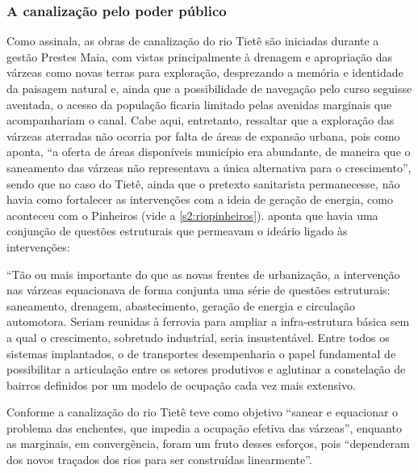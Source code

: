 \documentclass[
article,			%
11pt,				%
oneside,			%
a4paper,			%
english,			%
brazil,				%
sumario=tradicional
]{abntex2}
\begin{document}
%	
	
	\subsubsection{A canalização pelo poder público} \label{s3:canalizacaopub}
	
	Como  assinala, as obras de canalização do rio Tietê são iniciadas durante a gestão Prestes Maia, com vistas principalmente à drenagem e apropriação das várzeas como novas terras para exploração, desprezando a memória e identidade da paisagem natural e, ainda que a possibilidade de navegação pelo curso seguisse aventada, o acesso da população ficaria limitado pelas avenidas marginais que acompanhariam o canal. Cabe aqui, entretanto, ressaltar que a exploração das várzeas aterradas não ocorria por falta de áreas de expansão urbana, pois como  aponta, ``a oferta de áreas disponíveis município era abundante, de maneira que
	o saneamento das várzeas não representava a única alternativa para o crescimento'', sendo que no caso do Tietê, ainda que o pretexto sanitarista permanecesse, não havia como fortalecer as intervenções com a ideia de geração de energia, como aconteceu com o Pinheiros (vide a \autoref{s2:riopinheiros}).  aponta que havia uma conjunção de questões estruturais que permeavam o ideário ligado às intervenções:
	
	\begin{citacao}
		``Tão ou mais importante do que as novas frentes de urbanização, a intervenção nas várzeas equacionava de forma conjunta uma série de questões estruturais: saneamento, drenagem, abastecimento, geração de energia e circulação automotora. Seriam reunidas à ferrovia para ampliar a infra-estrutura básica sem a qual o crescimento, sobretudo industrial, seria insustentável. Entre todos os sistemas implantados, o de transportes desempenharia o papel fundamental de possibilitar a articulação entre os setores produtivos e aglutinar a constelação de bairros definidos por um modelo de ocupação cada vez mais extensivo.
	\end{citacao}
	
	Conforme  a canalização do rio Tietê teve como objetivo ``sanear e equacionar o problema das enchentes, que impedia a ocupação efetiva das várzeas'', enquanto as marginais, em convergência, foram um fruto desses esforços, pois ``dependeram dos novos traçados dos rios para ser construídas linearmente''.
		
\end{document}

